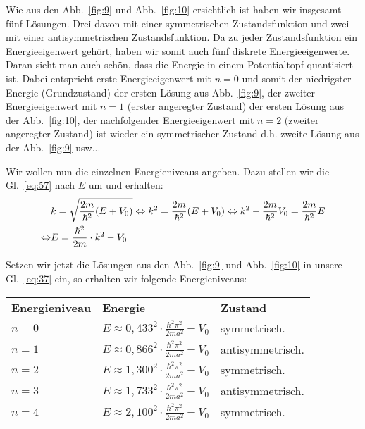 Wie aus den Abb.~\ref{fig:9} und Abb.~\ref{fig:10} ersichtlich ist haben wir
insgesamt fünf Lösungen. Drei davon mit einer symmetrischen Zustandsfunktion und
zwei mit einer antisymmetrischen Zustandsfunktion. Da zu jeder Zustandsfunktion
ein Energieeigenwert gehört, haben wir somit auch fünf diskrete
Energieeigenwerte. Daran sieht man auch schön, dass die Energie in einem
Potentialtopf quantisiert ist. Dabei entspricht erste Energieeigenwert mit $n=0$
und somit der niedrigster Energie (Grundzustand) der ersten Lösung aus
Abb.~\ref{fig:9}, der zweiter Energieeigenwert mit $n=1$ (erster angeregter
Zustand) der ersten Lösung aus der Abb.~\ref{fig:10}, der nachfolgender
Energieeigenwert mit $n=2$ (zweiter angeregter Zustand) ist wieder ein
symmetrischer Zustand d.h. zweite Lösung aus der Abb.~\ref{fig:9} usw...

Wir wollen nun die einzelnen Energieniveaus angeben. Dazu
stellen wir die Gl.~\eqref{eq:57} nach $E$ um und erhalten:
\begin{align}
  &k=\sqrt{\frac{2m}{\hbar^2}(E+V_0)}
  \Leftrightarrow k^2=\frac{2m}{\hbar^2}(E+V_0)
  \Leftrightarrow k^2-\frac{2m}{\hbar^2}V_0 = \frac{2m}{\hbar^2} E\notag\\
  \Leftrightarrow &E=\frac{\hbar^2}{2m}\cdot k^2-V_0\label{eq:37}
\end{align}

Setzen wir jetzt die Lösungen aus den Abb.~\ref{fig:9} und Abb.~\ref{fig:10} in
unsere Gl.~\eqref{eq:37} ein, so erhalten wir folgende Energieniveaus:\\

\begin{tabular}{lll}
\textbf{Energieniveau} & \textbf{Energie} & \textbf{Zustand}\\[2ex] 
  \( n=0 \) & \(E\approx 0,433^2\cdot\frac{\hbar^2\pi^2}{2ma^2}-V_0\) &
  symmetrisch.\\[2ex]
  \( n=1 \) & \(E\approx 0,866^2\cdot\frac{\hbar^2\pi^2}{2ma^2}-V_0\) & 
  antisymmetrisch.\\[2ex]
  \( n=2 \) & \(E\approx 1,300^2\cdot\frac{\hbar^2\pi^2}{2ma^2}-V_0\) &
  symmetrisch.\\[2ex]
  \( n=3 \) & \(E\approx 1,733^2\cdot\frac{\hbar^2\pi^2}{2ma^2}-V_0\) & 
  antisymmetrisch.\\[2ex]
  \( n=4 \) & \(E\approx 2,100^2\cdot\frac{\hbar^2\pi^2}{2ma^2}-V_0\) &
  symmetrisch.
\end{tabular}
\\
\\

